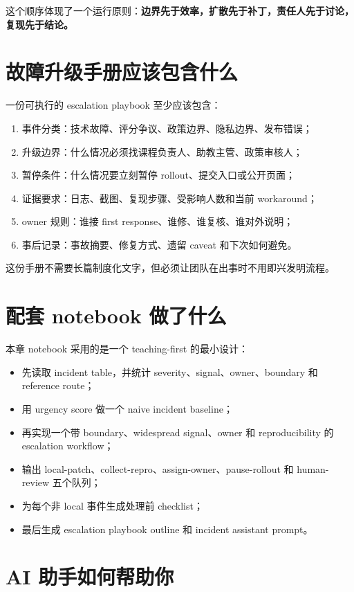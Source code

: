 这个顺序体现了一个运行原则：\textbf{边界先于效率，扩散先于补丁，责任人先于讨论，复现先于结论。}

\section{故障升级手册应该包含什么}

一份可执行的 escalation playbook 至少应该包含：

\begin{enumerate}
    \item 事件分类：技术故障、评分争议、政策边界、隐私边界、发布错误；
    \item 升级边界：什么情况必须找课程负责人、助教主管、政策审核人；
    \item 暂停条件：什么情况要立刻暂停 rollout、提交入口或公开页面；
    \item 证据要求：日志、截图、复现步骤、受影响人数和当前 workaround；
    \item owner 规则：谁接 first response、谁修、谁复核、谁对外说明；
    \item 事后记录：事故摘要、修复方式、遗留 caveat 和下次如何避免。
\end{enumerate}

这份手册不需要长篇制度化文字，但必须让团队在出事时不用即兴发明流程。

\section{配套 notebook 做了什么}

本章 notebook 采用的是一个 teaching-first 的最小设计：

\begin{itemize}
    \item 先读取 incident table，并统计 severity、signal、owner、boundary 和 reference route；
    \item 用 urgency score 做一个 naive incident baseline；
    \item 再实现一个带 boundary、widespread signal、owner 和 reproducibility 的 escalation workflow；
    \item 输出 local-patch、collect-repro、assign-owner、pause-rollout 和 human-review 五个队列；
    \item 为每个非 local 事件生成处理前 checklist；
    \item 最后生成 escalation playbook outline 和 incident assistant prompt。
\end{itemize}

\section{AI 助手如何帮助你}

